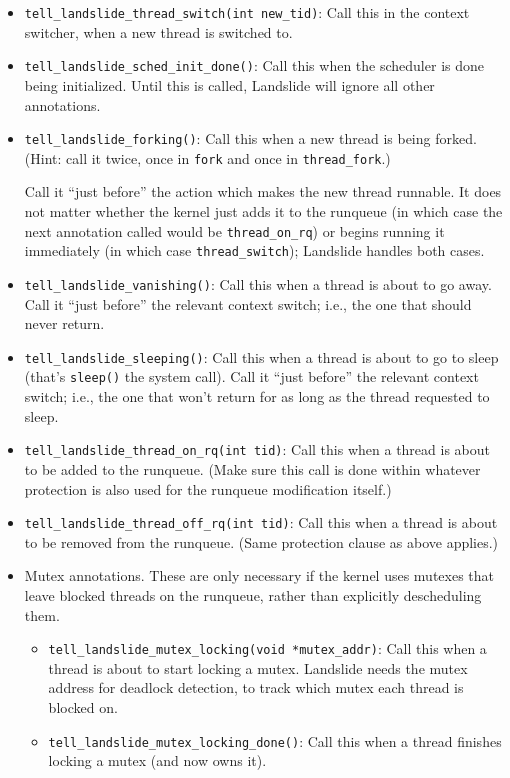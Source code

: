 \begin{itemize}
	\small
	\item \texttt{tell\_landslide\_thread\_switch(int new\_tid)}: Call this in the context switcher, when a new thread is switched to.
	\item \texttt{tell\_landslide\_sched\_init\_done()}: Call this when the scheduler is done being initialized. Until this is called, Landslide will ignore all other annotations.
	\item \texttt{tell\_landslide\_forking()}: Call this when a new thread is being forked.
		(Hint: call it twice, once in \texttt{fork} and once in \texttt{thread\_fork}.)

		Call it ``just before'' the action which makes the new thread runnable. It does not matter whether the kernel just adds it to the runqueue (in which case the next annotation called would be \texttt{thread\_on\_rq}) or begins running it immediately (in which case \texttt{thread\_switch}); Landslide handles both cases.
	\item \texttt{tell\_landslide\_vanishing()}: Call this when a thread is about to go away.
		Call it ``just before'' the relevant context switch; i.e., the one that should never return.
	\item \texttt{tell\_landslide\_sleeping()}: Call this when a thread is about to go to sleep (that's \texttt{sleep()} the system call).
		Call it ``just before'' the relevant context switch; i.e., the one that won't return for as long as the thread requested to sleep.
	\item \texttt{tell\_landslide\_thread\_on\_rq(int tid)}: Call this when a thread is about to be added to the runqueue.
		(Make sure this call is done within whatever protection is also used for the runqueue modification itself.)
	\item \texttt{tell\_landslide\_thread\_off\_rq(int tid)}: Call this when a thread is about to be removed from the runqueue. (Same protection clause as above applies.)
	\item Mutex annotations. These are only necessary if the kernel uses mutexes that leave blocked threads on the runqueue, rather than explicitly descheduling them.
	\begin{itemize}
		\item \texttt{tell\_landslide\_mutex\_locking(void *mutex\_addr)}: Call this when a thread is about to start locking a mutex. Landslide needs the mutex address for deadlock detection, to track which mutex each thread is blocked on.
		\item \texttt{tell\_landslide\_mutex\_locking\_done()}: Call this when a thread finishes locking a mutex (and now owns it).

\end{itemize}
\end{itemize}
